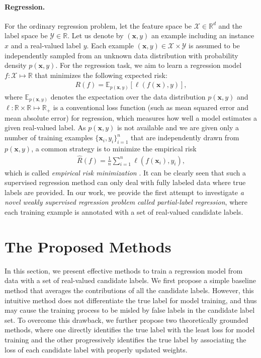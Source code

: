 \documentclass[letterpaper]{article} %
\begin{document}
\paragraph{Regression.} For the ordinary regression problem, let the feature space be $\mathcal{X}\in\mathbb{R}^d$ and the label space be $\mathcal{Y}\in\mathbb{R}$. Let us denote by $(\bm{x},y)$ an example including an instance $x$ and a real-valued label $y$. Each example $(\bm{x},y)\in\mathcal{X}\times\mathcal{Y}$ is assumed to be independently sampled from an unknown data distribution with probability density $p(\bm{x},y)$. For the regression task, we aim to learn a regression model $f:\mathcal{X}\mapsto\mathbb{R}$ that minimizes the following expected risk:
\begin{gather}
\label{expected_regression}
R(f)=\mathbb{E}_{p(\bm{x},y)}[\ell(f(\bm{x}),y)],
\end{gather}
where $\mathbb{E}_{p(\bm{x},y)}$ denotes the expectation over the data distribution $p(\bm{x},y)$ and $\ell:\mathbb{R}\times\mathbb{R}\mapsto\mathbb{R}_+$ is a conventional loss function (such as mean squared error and mean absolute error) for regression, which measures how well a model estimates a given real-valued label. As $p(\boldsymbol{x},y)$ is not available and we are given only a number of training examples $\{\boldsymbol{x}_i,y_i\}_{i=1}^n$ that are independently drawn from $p(\boldsymbol{x},y)$, a common strategy is to minimize the empirical risk
\begin{gather}
\label{empirical_regression}
\widehat{R}(f) = \frac{1}{n}\sum\nolimits_{i=1}^n\ell(f(\boldsymbol{x}_i),y_i),
\end{gather}
which is called \emph{empirical risk minimization} \cite{vapnik1999overview}. It can be clearly seen that such a supervised regression method can only deal with fully labeled data where true labels are provided. In our work, we provide the first attempt to investigate \emph{a novel weakly supervised regression problem called partial-label regression}, where each training example is annotated with a set of real-valued candidate labels.


\section{The Proposed Methods}
In this section, we present effective methods to train a regression model from data with a set of real-valued candidate labels. We first propose a simple baseline method that averages the contributions of all the candidate labels. However, this intuitive method does not differentiate the true label for model training, and thus may cause the training process to be misled by false labels in the candidate label set. To overcome this drawback, we further propose two theoretically grounded methods, where one directly identifies the true label with the least loss for model training and the other progressively identifies the true label by associating the loss of each candidate label with properly updated weights.
\end{document}
